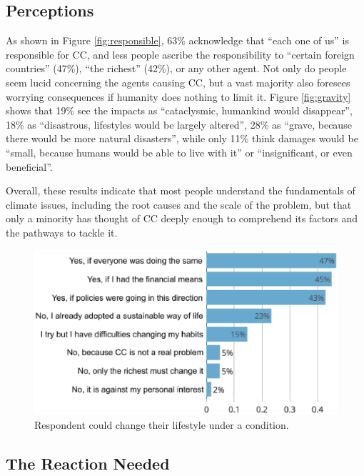 \documentclass[english,5p,authoryear]{elsarticle}
\begin{document}
    \subsection{Perceptions\label{subsec:opinions}}
%
As shown in Figure \ref{fig:responsible}, 63\% acknowledge that ``each one of us'' is responsible for CC, and less people ascribe the responsibility to ``certain foreign countries'' (47\%), ``the richest'' (42\%), or any other agent.  Not only do people seem lucid concerning the agents causing CC, but a vast majority also foresees worrying consequences if humanity does nothing to limit it. Figure \ref{fig:gravity} shows that 19\% see the impacts as ``cataclysmic, humankind would disappear'', 18\% as ``disastrous, lifestyles would be largely altered'', 28\% as ``grave, because there would be more natural disasters'', while only 11\% think damages would be ``small, because humans would be able to live with it'' or ``insignificant, or even beneficial''. 

%

%

Overall, these results indicate that most people understand the fundamentals of climate issues, including the root causes and the scale of the problem, but that only a minority has thought of CC deeply enough to comprehend its factors and the pathways to tackle it.
%

%
%
    
%
%

\begin{figure}[t]
\centering
\includegraphics[width=\columnwidth]{Images_EPS/change_if_no.eps}
\caption{Respondent could change their lifestyle under a condition.}
\label{fig:condition}
\end{figure}

    \subsection{The Reaction Needed\label{subsec:reaction}}
\end{document}
